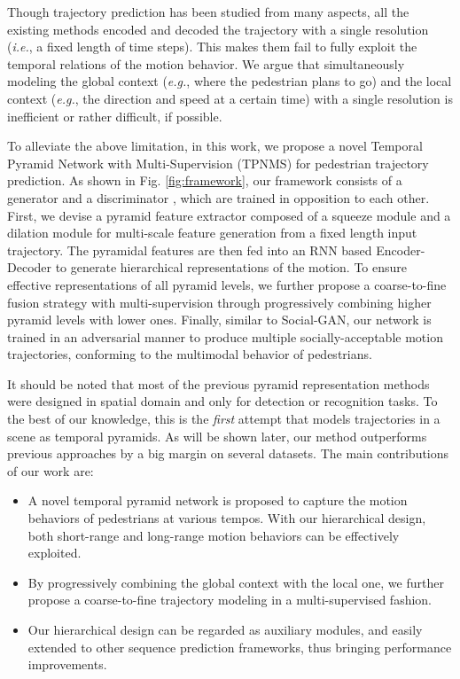 \documentclass[letterpaper]{article} \usepackage{aaai21}  \usepackage{times}  \usepackage{helvet} \usepackage{courier}  \usepackage[hyphens]{url}  \usepackage{graphicx} \urlstyle{rm} \def\UrlFont{\rm}  \usepackage{natbib}  \usepackage{caption} \frenchspacing  \setlength{\pdfpagewidth}{8.5in}  \setlength{\pdfpageheight}{11in}
\begin{document}
Though trajectory prediction has been studied from many aspects, all the existing methods encoded and decoded the trajectory with a single resolution (\textit{i.e.}, a fixed length of time steps). This makes them fail to fully exploit the temporal relations of the motion behavior. We argue that simultaneously modeling the global context (\textit{e.g.}, where the pedestrian plans to go) and  the local context (\textit{e.g.}, the direction and speed at a certain time) with a single resolution is inefficient or rather difficult, if possible.  



To alleviate the above limitation, in this work, we propose a novel Temporal Pyramid Network with Multi-Supervision (TPNMS) for pedestrian trajectory prediction. As shown in Fig. \ref{fig:framework}, our framework consists of a generator  and a discriminator , which are trained in opposition to each other.
First, we devise a pyramid feature extractor composed of a squeeze module and a dilation module for multi-scale feature generation from a fixed length input trajectory. The pyramidal features are then fed into an RNN based Encoder-Decoder to generate hierarchical representations of the motion. To ensure effective representations of all pyramid levels, we further propose a coarse-to-fine fusion strategy with multi-supervision through progressively combining higher pyramid levels with lower ones. 
Finally, similar to Social-GAN, our network is trained in an adversarial manner to produce multiple socially-acceptable motion trajectories, conforming to the multimodal behavior of pedestrians.

It should be noted that most of the previous pyramid representation methods were designed in spatial domain and only for detection or recognition tasks. To the best of our knowledge, this is the \textit{first} attempt that models trajectories in a scene as temporal pyramids. As will be shown later, our method outperforms previous approaches by a big margin on several datasets. 
The main contributions of our work are:
\begin{itemize}
	\item A novel temporal pyramid network is proposed to capture the motion behaviors of pedestrians at various tempos. With our hierarchical design, both short-range and long-range motion behaviors can be effectively exploited.  
	\item By progressively combining the global context with the local one, we further propose a coarse-to-fine trajectory modeling in a multi-supervised fashion.
	\item Our hierarchical design can be regarded as auxiliary modules, and easily extended to other sequence prediction frameworks, thus bringing performance improvements.
\end{itemize}
\end{document}
